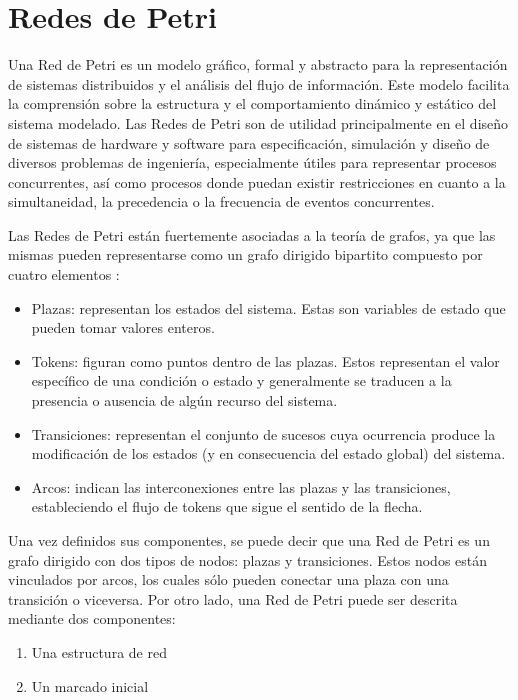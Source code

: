 \section{Redes de Petri}

Una Red de Petri es un modelo gráfico, formal y abstracto para la representación de sistemas distribuidos y el análisis del flujo de información. Este modelo facilita la comprensión sobre la estructura y el comportamiento dinámico y estático del sistema modelado. Las Redes de Petri son de utilidad principalmente en el diseño de sistemas de hardware y software para especificación, simulación y diseño de diversos problemas de ingeniería, especialmente útiles para representar procesos concurrentes, así como procesos donde puedan existir restricciones en cuanto a la simultaneidad, la precedencia o la frecuencia de eventos concurrentes. \cite{brams} \cite{marwedelcyberphysical}

Las Redes de Petri están fuertemente asociadas a la teoría de grafos, ya que las mismas pueden representarse como un grafo dirigido bipartito compuesto por cuatro elementos \cite{libropopn}:

\begin{itemize}
    \item Plazas: representan los estados del sistema. Estas son variables de estado que pueden tomar valores enteros.
    \item Tokens: figuran como puntos dentro de las plazas. Estos representan el valor específico de una condición o estado y generalmente se traducen a la presencia o ausencia de algún recurso del sistema.
    \item Transiciones: representan el conjunto de sucesos cuya ocurrencia produce la modificación de los estados (y en consecuencia del estado global) del sistema.
    \item Arcos: indican las interconexiones entre las plazas y las transiciones, estableciendo el flujo de tokens que sigue el sentido de la flecha.
\end{itemize}

Una vez definidos sus componentes, se puede decir que una Red de Petri es un grafo dirigido con dos tipos de nodos: plazas y transiciones. Estos nodos están vinculados por arcos, los cuales sólo pueden conectar una plaza con una transición o viceversa. Por otro lado, una Red de Petri puede ser descrita mediante dos componentes:

\begin{enumerate}
    \item Una estructura de red
    \item Un marcado inicial
\end{enumerate}

